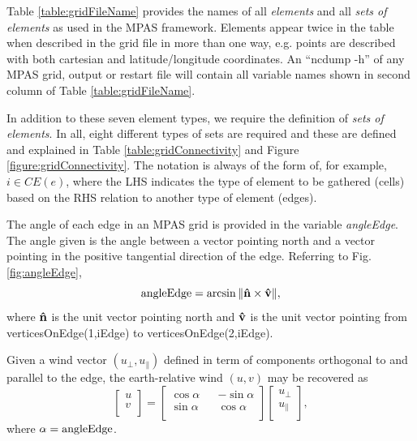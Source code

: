 Table \ref{table:gridFileName} provides the names of all {\it elements} and all {\it sets of elements} as used in the MPAS framework.  Elements appear twice in the table when described in the grid file in more than one way, e.g. points are described with both cartesian and latitude/longitude coordinates. An ``ncdump -h'' of any MPAS grid, output or restart file will contain all variable names shown in second column of Table  \ref{table:gridFileName}.


In addition to these seven element types, we require the definition of {\it sets of elements}. In all, eight different types of sets are required and these are defined and explained in Table \ref{table:gridConnectivity} and Figure \ref{figure:gridConnectivity}. The notation is always of the form of, for example, $i \in CE(e)$, where the LHS indicates the type of element to be gathered (cells) based on the RHS relation to another type of element (edges).

The angle of each edge in an MPAS grid is provided in the variable {\it angleEdge}. The angle
given is the angle between a vector pointing north and a vector pointing in the
positive tangential direction of the edge. Referring to Fig. \ref{fig:angleEdge},
\[ {\rm angleEdge} = \arcsin\|{\bf \hat n} \times {\bf \hat v}\|, \]
where ${\bf \hat n}$ is the unit vector pointing north and ${\bf \hat v}$ is the unit vector
pointing from verticesOnEdge(1,iEdge) to verticesOnEdge(2,iEdge).

Given a wind vector $(u_\perp, u_\parallel)$ defined in term of components orthogonal to
and parallel to the edge, the earth-relative wind $(u,v)$ may be recovered as
\[
\begin{bmatrix}
u \\
v \\
\end{bmatrix}
=
\begin{bmatrix}
\cos\alpha && -\sin\alpha \\
\sin\alpha && \cos\alpha \\
\end{bmatrix}
\begin{bmatrix}
u_\perp \\
u_\parallel \\
\end{bmatrix},
\]
where $\alpha = {\rm angleEdge}$.
\bigskip\bigskip\bigskip


